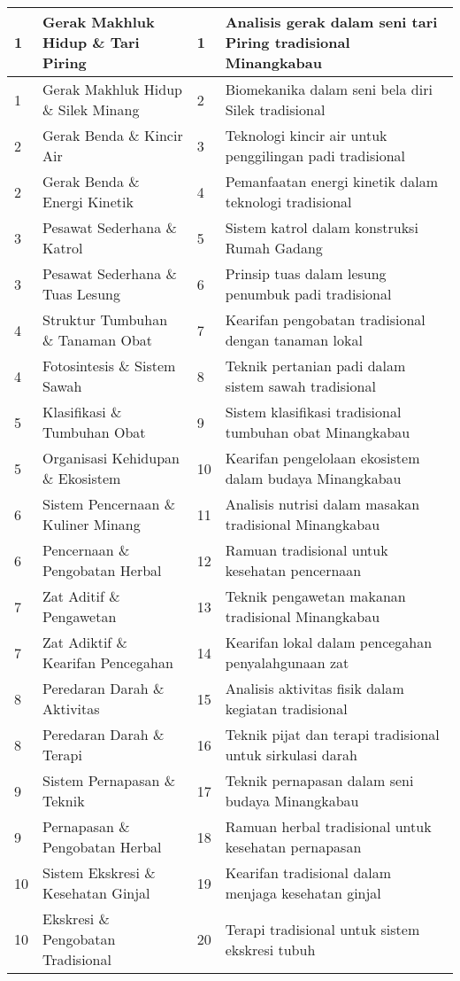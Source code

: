 \documentclass[12pt,a4paper]{article}
\begin{document}
\begin{tcolorbox}[colback=white, colframe=black, breakable, title=\textbf{Integrasi Etnosains Minangkabau dalam RPP IPA Kelas VIII}]
\begin{longtable}{|p{1cm}|p{5.5cm}|p{2cm}|p{5.5cm}|}
1 & Gerak Makhluk Hidup \& Tari Piring & 1 & Analisis gerak dalam seni tari Piring tradisional Minangkabau \\
\hline
1 & Gerak Makhluk Hidup \& Silek Minang & 2 & Biomekanika dalam seni bela diri Silek tradisional \\
\hline
2 & Gerak Benda \& Kincir Air & 3 & Teknologi kincir air untuk penggilingan padi tradisional \\
\hline
2 & Gerak Benda \& Energi Kinetik & 4 & Pemanfaatan energi kinetik dalam teknologi tradisional \\
\hline
3 & Pesawat Sederhana \& Katrol & 5 & Sistem katrol dalam konstruksi Rumah Gadang \\
\hline
3 & Pesawat Sederhana \& Tuas Lesung & 6 & Prinsip tuas dalam lesung penumbuk padi tradisional \\
\hline
4 & Struktur Tumbuhan \& Tanaman Obat & 7 & Kearifan pengobatan tradisional dengan tanaman lokal \\
\hline
4 & Fotosintesis \& Sistem Sawah & 8 & Teknik pertanian padi dalam sistem sawah tradisional \\
\hline
5 & Klasifikasi \& Tumbuhan Obat & 9 & Sistem klasifikasi tradisional tumbuhan obat Minangkabau \\
\hline
5 & Organisasi Kehidupan \& Ekosistem & 10 & Kearifan pengelolaan ekosistem dalam budaya Minangkabau \\
\hline
6 & Sistem Pencernaan \& Kuliner Minang & 11 & Analisis nutrisi dalam masakan tradisional Minangkabau \\
\hline
6 & Pencernaan \& Pengobatan Herbal & 12 & Ramuan tradisional untuk kesehatan pencernaan \\
\hline
7 & Zat Aditif \& Pengawetan & 13 & Teknik pengawetan makanan tradisional Minangkabau \\
\hline
7 & Zat Adiktif \& Kearifan Pencegahan & 14 & Kearifan lokal dalam pencegahan penyalahgunaan zat \\
\hline
8 & Peredaran Darah \& Aktivitas & 15 & Analisis aktivitas fisik dalam kegiatan tradisional \\
\hline
8 & Peredaran Darah \& Terapi & 16 & Teknik pijat dan terapi tradisional untuk sirkulasi darah \\
\hline
9 & Sistem Pernapasan \& Teknik & 17 & Teknik pernapasan dalam seni budaya Minangkabau \\
\hline
9 & Pernapasan \& Pengobatan Herbal & 18 & Ramuan herbal tradisional untuk kesehatan pernapasan \\
\hline
10 & Sistem Ekskresi \& Kesehatan Ginjal & 19 & Kearifan tradisional dalam menjaga kesehatan ginjal \\
\hline
10 & Ekskresi \& Pengobatan Tradisional & 20 & Terapi tradisional untuk sistem ekskresi tubuh \\
\hline


\end{longtable}
\end{tcolorbox}
\end{document}

